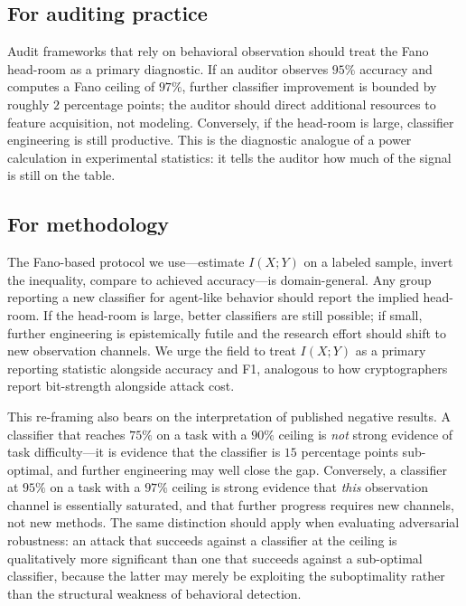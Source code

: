 \documentclass[11pt,a4paper]{article}
\begin{document}
\subsection*{For auditing practice}

Audit frameworks\cite{raji2020closing,metaxa2021auditing,koshiyama2021algorithmic}
that rely on behavioral observation should treat the Fano head-room as a
primary diagnostic. If an auditor observes $95\%$ accuracy and computes a
Fano ceiling of $97\%$, further classifier improvement is bounded by
roughly $2$ percentage points; the auditor should direct additional
resources to feature acquisition, not modeling. Conversely, if the
head-room is large, classifier engineering is still productive. This is
the diagnostic analogue of a power calculation in experimental
statistics: it tells the auditor how much of the signal is still
on the table.

\subsection*{For methodology}

The Fano-based protocol we use---estimate $I(X;Y)$ on a labeled sample,
invert the inequality, compare to achieved accuracy---is domain-general.
Any group reporting a new classifier for agent-like behavior should
report the implied head-room. If the head-room is large, better
classifiers are still possible; if small, further engineering is
epistemically futile and the research effort should shift to new
observation channels. We urge the field to treat $I(X;Y)$ as a primary
reporting statistic alongside accuracy and F1, analogous to how
cryptographers report bit-strength alongside attack cost.

This re-framing also bears on the interpretation of published negative
results. A classifier that reaches $75\%$ on a task with a $90\%$
ceiling is \emph{not} strong evidence of task difficulty---it is
evidence that the classifier is $15$ percentage points sub-optimal, and
further engineering may well close the gap. Conversely, a classifier at
$95\%$ on a task with a $97\%$ ceiling is strong evidence that
\emph{this} observation channel is essentially saturated, and that
further progress requires new channels, not new methods. The same
distinction should apply when evaluating adversarial robustness: an
attack that succeeds against a classifier at the ceiling is qualitatively
more significant than one that succeeds against a sub-optimal classifier,
because the latter may merely be exploiting the suboptimality rather
than the structural weakness of behavioral detection.
\end{document}
